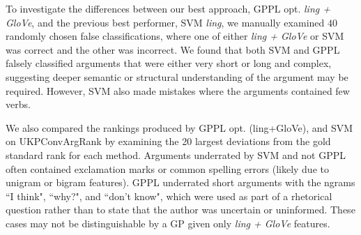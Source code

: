 To investigate the differences between our best approach, GPPL opt. \emph{ling + GloVe}, 
and the previous best performer, SVM \emph{ling}, 
we manually examined $40$ randomly chosen false classifications, where one of 
either  \emph{ling + GloVe} or SVM was correct and the other was incorrect. 
We found that both SVM and GPPL falsely classified arguments that were either very short or long and complex, suggesting deeper semantic or structural understanding of the argument may be required. However, SVM also made mistakes
where the arguments contained few verbs.

We also compared the rankings produced by GPPL opt. (ling+GloVe), 
and SVM on UKPConvArgRank by examining the 20 largest deviations from the 
gold standard rank for each method. Arguments underrated by SVM and not GPPL often 
contained exclamation marks or common spelling errors (likely due to unigram or bigram features).
GPPL underrated short arguments with the ngrams ``I think", ``why?", and
``don't know", which were used as part of a rhetorical question
rather than to state that the author was uncertain or uninformed.
These cases may not be distinguishable by a GP given only \emph{ling + GloVe} features.


